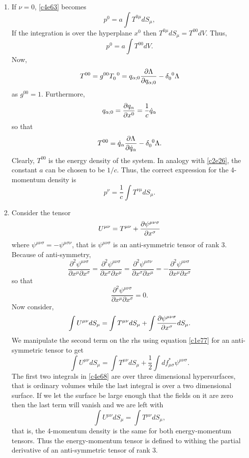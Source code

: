 \begin{enumerate}
\item If $\nu = 0$, \eqref{c4e63} becomes
\[
p^0 = a\int T^{0\mu}dS_\mu,
\]
If the integration is over the hyperplane $x^0$ then $T^{0\mu}dS_\mu = T^{00}dV$. Thus,
\[
p^0 = a\int T^{00}dV.
\]
Now, 
\[
T^{00} = g^{00}\tensor{T}{_0^0} = q_{\alpha;0}\pdt{\Lambda}{q_{\alpha;0}} - 
\tensor{\delta}{_0^0} \Lambda
\]
as $g^{00} = 1$. Furthermore, 
\[
q_{\alpha; 0} = \frac{\partial{q_\alpha}}{\partial{x^0}} = \frac{1}{c}\dot{q}_\alpha
\]
so that
\[
T^{00} = \dot{q}_\alpha\pdt{\Lambda}{\dot{q}_\alpha} - \tensor{\delta}{_0^0} \Lambda.
\]
Clearly, $T^{00}$ is the energy density of the system. In analogy with \eqref{c2e26},
the constant $a$ can be chosen to be $1/c$. Thus, the correct expression for the 
4-momentum density is
\begin{equation}\label{c4e64}
p^\nu = \frac{1}{c}\int T^{\nu\mu}dS_\mu.
\end{equation}

\item Consider the tensor
\begin{equation}\label{c4e65}
U^{\mu\nu} = T^{\mu\nu} + \frac{\partial{\psi^{\mu\nu\sigma}}}{\partial{x^\sigma}}
\end{equation}
where $\psi^{\mu\nu\sigma} = -\psi^{\mu\sigma\nu}$, that is $\psi^{\mu\nu\sigma}$
is an anti-symmetric tensor of rank 3. Because of anti-symmetry,
\[
\frac{\partial^2\psi^{\mu\nu\sigma}}{\partial x^\mu \partial x^\sigma} = 
\frac{\partial^2\psi^{\mu\nu\sigma}}{\partial x^\sigma \partial x^\mu} = 
\frac{\partial^2\psi^{\mu\sigma\nu}}{\partial x^\sigma \partial x^\mu} = 
-\frac{\partial^2\psi^{\mu\nu\sigma}}{\partial x^\mu \partial x^\sigma}
\]
so that
\begin{equation}\label{c4e66}
\frac{\partial^2\psi^{\mu\nu\sigma}}{\partial x^\mu \partial x^\sigma} = 0.
\end{equation}
Now consider,
\begin{equation}\label{c4e67}
\int U^{\mu\nu} dS_\mu = \int T^{\mu\nu} dS_\mu + 
\int\frac{\partial{\psi^{\mu\nu\sigma}}}{\partial{x^\sigma}} dS_\mu.
\end{equation}
We manipulate the second term on the rhs using equation \eqref{c1e77} for an 
anti-symmetric tensor to get
\begin{equation}\label{c4e68}
\int U^{\mu\nu} dS_\mu = \int T^{\mu\nu} dS_\mu + 
\frac{1}{2}\int df^\ast_{\mu\sigma}\psi^{\mu\nu\sigma}.
\end{equation}
The first two integrals in \eqref{c4e68} are over three dimensional hypersurfaces,
that is ordinary volumes while the last integral is over a two dimensional surface.
If we let the surface be large enough that the fields on it are zero then the
last term will vanish and we are left with
\begin{equation}\label{c4e69}
\int U^{\mu\nu} dS_\mu = \int T^{\mu\nu} dS_\mu,
\end{equation}
that is, the 4-momentum density is the same for both energy-momentum tensors. Thus
the energy-momentum tensor is defined to withing the partial derivative of an
anti-symmetric tensor of rank 3.


\end{enumerate}
